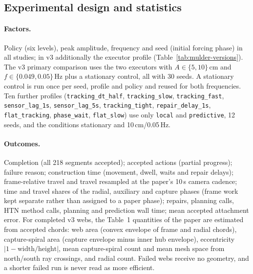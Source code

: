 \subsection{Experimental design and statistics}
\label{sec:mulder-design}

\paragraph{Factors.} Policy (six levels), peak amplitude, frequency and seed (initial forcing phase) in
all studies; in v3 additionally the executor profile (Table~\ref{tab:mulder-versions}). The v3 primary
comparison uses the two executors with $A\in\{5,10\}$\,cm and $f\in\{0.049,0.05\}$\,Hz plus a stationary
control, all with 30 seeds. A stationary control is run once per seed, profile and policy and reused for
both frequencies. Ten further profiles (\texttt{tracking\_\allowbreak{}dt\_\allowbreak{}half}, \texttt{tracking\_\allowbreak{}slow},
\texttt{tracking\_\allowbreak{}fast}, \texttt{sensor\_\allowbreak{}lag\_\allowbreak{}1s}, \texttt{sensor\_\allowbreak{}lag\_\allowbreak{}5s}, \texttt{tracking\_\allowbreak{}tight},
\texttt{repair\_\allowbreak{}delay\_\allowbreak{}1s}, \texttt{flat\_\allowbreak{}tracking}, \texttt{phase\_\allowbreak{}wait}, \texttt{flat\_\allowbreak{}slow}) use only
\texttt{local} and \texttt{predictive}, 12 seeds, and the conditions stationary and 10\,cm/0.05\,Hz.

\paragraph{Outcomes.} Completion (all 218 segments accepted); accepted actions (partial progress);
failure reason; construction time (movement, dwell, waits and repair delays); frame-relative travel
and travel resampled at the paper's 10\,s camera cadence; time and travel shares of the radial,
auxiliary and capture phases (frame work kept separate rather than assigned to a paper phase);
repairs, planning calls, HTN method calls, planning and prediction wall time; mean accepted
attachment error. For completed v3 webs, the Table~1 quantities of the paper are estimated from
accepted chords: web area (convex envelope of frame and radial chords), capture-spiral area
(capture envelope minus inner hub envelope), eccentricity $|1-\text{width}/\text{height}|$, mean
capture-spiral count and mean mesh space from north/south ray crossings, and radial count.
Failed webs receive no geometry, and a shorter failed run is never read as more efficient.


